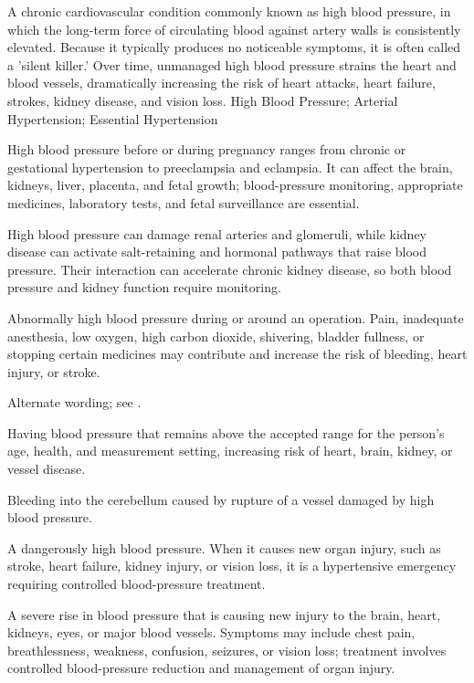  A chronic cardiovascular condition commonly known as high blood pressure, in which the long-term force of circulating blood against artery walls is consistently elevated. Because it typically produces no noticeable symptoms, it is often called a 'silent killer.' Over time, unmanaged high blood pressure strains the heart and blood vessels, dramatically increasing the risk of heart attacks, heart failure, strokes, kidney disease, and vision loss.
\synonyms
High Blood Pressure; Arterial Hypertension; Essential Hypertension

 High blood pressure before or during pregnancy ranges from chronic or gestational hypertension to preeclampsia and eclampsia. It can affect the brain, kidneys, liver, placenta, and fetal growth; blood-pressure monitoring, appropriate medicines, laboratory tests, and fetal surveillance are essential.

 High blood pressure can damage renal arteries and glomeruli, while kidney disease can activate salt-retaining and hormonal pathways that raise blood pressure. Their interaction can accelerate chronic kidney disease, so both blood pressure and kidney function require monitoring.

 Abnormally high blood pressure during or around an operation. Pain, inadequate anesthesia, low oxygen, high carbon dioxide, shivering, bladder fullness, or stopping certain medicines may contribute and increase the risk of bleeding, heart injury, or stroke.

 Alternate wording; see .

 Having blood pressure that remains above the accepted range for the person's age, health, and measurement setting, increasing risk of heart, brain, kidney, or vessel disease.

 Bleeding into the cerebellum caused by rupture of a vessel damaged by high blood pressure.

 A dangerously high blood pressure. When it causes new organ injury, such as stroke, heart failure, kidney injury, or vision loss, it is a hypertensive emergency requiring controlled blood-pressure treatment.

 A severe rise in blood pressure that is causing new injury to the brain, heart, kidneys, eyes, or major blood vessels. Symptoms may include chest pain, breathlessness, weakness, confusion, seizures, or vision loss; treatment involves controlled blood-pressure reduction and management of organ injury.

